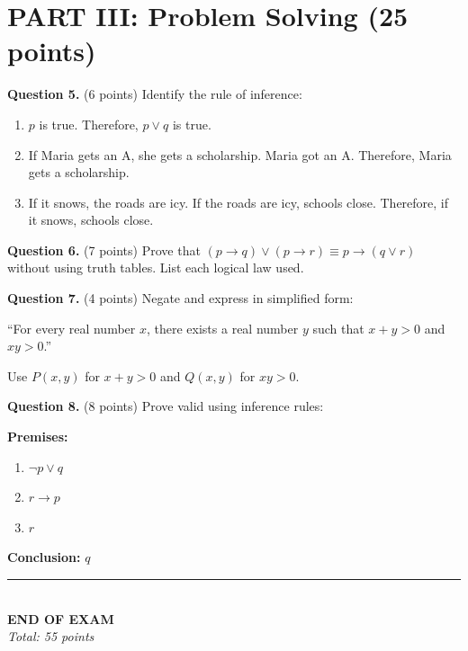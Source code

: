 \documentclass[11pt,a4paper]{article}
\begin{document}
\newpage

\section*{PART III: Problem Solving (25 points)}

\textbf{Question 5.} (6 points) Identify the rule of inference:

\begin{enumerate}[label=(\roman*)]
    \item $p$ is true. Therefore, $p \lor q$ is true.
    
    \vspace{40pt}
    
    \item If Maria gets an A, she gets a scholarship. Maria got an A. Therefore, Maria gets a scholarship.
    
    \vspace{40pt}
    
    \item If it snows, the roads are icy. If the roads are icy, schools close. Therefore, if it snows, schools close.
    
    \vspace{40pt}
\end{enumerate}

\textbf{Question 6.} (7 points) Prove that $(p \to q) \lor (p \to r) \equiv p \to (q \lor r)$ without using truth tables. List each logical law used.

\vspace{140pt}

\textbf{Question 7.} (4 points) Negate and express in simplified form:

``For every real number $x$, there exists a real number $y$ such that $x + y > 0$ and $xy > 0$.''

Use $P(x,y)$ for $x + y > 0$ and $Q(x,y)$ for $xy > 0$.

\vspace{100pt}

\textbf{Question 8.} (8 points) Prove valid using inference rules:

\textbf{Premises:}
\begin{enumerate}[noitemsep]
    \item $\neg p \lor q$
    \item $r \to p$
    \item $r$
\end{enumerate}

\textbf{Conclusion:} $q$

\vspace{120pt}

\begin{center}
\rule{0.5\textwidth}{0.5pt}\\[5pt]
\textbf{END OF EXAM}\\[3pt]
\textit{Total: 55 points}
\end{center}
\end{document}
